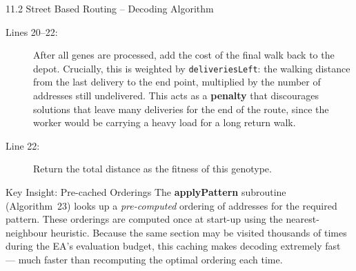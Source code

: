 \documentclass[aspectratio=169,10pt]{beamer}
\begin{document}
\begin{frame}[allowframebreaks]{11.2 Street Based Routing -- Decoding Algorithm}
  \begin{description}
    \item[Lines 20--22:] After all genes are processed, add the cost of the
      final walk back to the depot.  Crucially, this is weighted by
      \texttt{deliveriesLeft}: the walking distance from the last delivery to
      the end point, multiplied by the number of addresses still undelivered.
      This acts as a \textbf{penalty} that discourages solutions that leave
      many deliveries for the end of the route, since the worker would be
      carrying a heavy load for a long return walk.
    \item[Line 22:] Return the total distance as the fitness of this genotype.
  \end{description}

  \begin{alertblock}{Key Insight: Pre-cached Orderings}
    The \textbf{applyPattern} subroutine (Algorithm~23) looks up a
    \emph{pre-computed} ordering of addresses for the required pattern.
    These orderings are computed once at start-up using the nearest-neighbour
    heuristic.  Because the same section may be visited thousands of times
    during the EA's evaluation budget, this caching makes decoding extremely
    fast --- much faster than recomputing the optimal ordering each time.
  \end{alertblock}

\end{frame}
\end{document}
